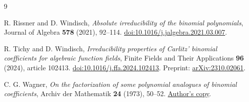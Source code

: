 \documentclass[11pt]{article}
\theoremstyle{remark}
\begin{document}
\begin{thebibliography}{9}

R. Rissner and D. Windisch,
\emph{Absolute irreducibility of the binomial polynomials},
Journal of Algebra \textbf{578} (2021), 92--114.
\href{https://doi.org/10.1016/j.jalgebra.2021.03.007}{doi:10.1016/j.jalgebra.2021.03.007}.

R. Tichy and D. Windisch,
\emph{Irreducibility properties of Carlitz' binomial coefficients for algebraic function fields},
Finite Fields and Their Applications \textbf{96} (2024), article 102413.
\href{https://doi.org/10.1016/j.ffa.2024.102413}{doi:10.1016/j.ffa.2024.102413}.
Preprint: \href{https://arxiv.org/abs/2310.02061}{arXiv:2310.02061}.

C. G. Wagner,
\emph{On the factorization of some polynomial analogues of binomial coefficients},
Archiv der Mathematik \textbf{24} (1973), 50--52.
\href{https://web.math.utk.edu/~wagner/papers/analogues.pdf}{Author's copy}.

\end{thebibliography}
\end{document}
